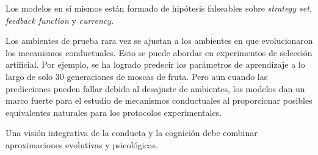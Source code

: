 \documentclass[a4paper,12pt]{article}
\begin{document}
Los modelos en sí mismos están formado de hipótesis falseables sobre {\itshape strategy set, feedback function} y {\itshape currency}. 

Los ambientes de prueba rara vez se ajustan a los ambientes en que evolucionaron los mecanismos conductuales. Esto se puede abordar en experimentos de selección artificial. Por ejemplo, se ha logrado predecir los parámetros de aprendizaje a lo largo de solo 30 generaciones de moscas de fruta. Pero aun cuando las predicciones pueden fallar debido al desajuste de ambientes, los modelos dan un marco fuerte para el estudio de mecanismos conductuales al proporcionar posibles equivalentes naturales para los protocolos experimentales.

Una visión integrativa de la conducta y la cognición debe combinar aproximaciones evolutivas y psicológicas.
\end{document}
